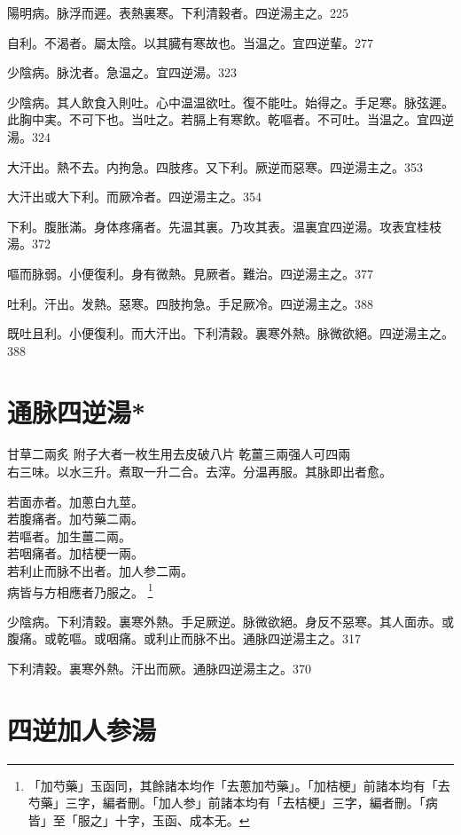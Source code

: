 {\khaaitp 陽明病。}脉浮而遲。表熱裏寒。下利清穀者。四逆湯主之。225

自利。不渴者。屬太陰。以其臓有寒故也。当温之。宜四逆輩。277

少陰病。脉沈者。急温之。宜四逆湯。323

少陰病。其人飲食入則吐。心中温温欲吐。復不能吐。始得之。手足寒。脉弦遲。此胸中実。不可下也。当吐之。若膈上有寒飲。乾嘔者。不可吐。当温之。宜四逆湯。324

大汗出。熱不去。内拘急。四肢疼。{\khaaitp 又}下利。厥逆而惡寒。四逆湯主之。353

大汗{\khaaitp 出}或大下利。而厥冷者。四逆湯主之。354

下利。腹{\khaaitp 胀}滿。身体疼痛者。先温其裏。乃攻其表。温裏宜四逆湯。攻表宜桂枝湯。372

嘔而脉弱。小便復利。身有微熱。見厥者。難治。四逆湯主之。377

吐利。汗出。发熱。惡寒。四肢拘急。手足厥冷。四逆湯主之。388

既吐且利。小便復利。而大汗出。下利清穀。裏寒外熱。脉微欲絕。四逆湯主之。388

\section{通脉四逆湯*}

甘草{\scriptsize 二兩炙} 附子{\scriptsize 大者一枚生用去皮破八片} 乾薑{\scriptsize 三兩强人可四兩}\\
右三味。以水三升。煮取一升二合。去滓。分温再服。其脉即出者愈。

{\khaaitp 若}面赤者。加蔥{\khaaitp 白}九莖。\\
{\khaaitp 若}腹痛者。加芍藥二兩。\\
{\khaaitp 若}嘔者。加生薑二兩。\\
{\khaaitp 若}咽痛者。加桔梗一兩。\\
{\khaaitp 若}利止而脉不出者。加人参二兩。\\
{\khaaitp 病皆与方相應者乃服之。}
	\footnote{
		「加芍藥」玉函同，其餘諸本均作「去蔥加芍藥」。「加桔梗」前諸本均有「去芍藥」三字，編者刪。「加人参」前諸本均有「去桔梗」三字，編者刪。「病皆」至「服之」十字，玉函、成本无。
	}

少陰病。下利清穀。裏寒外熱。手足厥逆。脉微欲絕。身反不惡寒。其人面赤。或腹痛。或乾嘔。或咽痛。或利止而脉不出。通脉四逆湯主之。317

下利清穀。裏寒外熱。汗出而厥。通脉四逆湯主之。370

\section{四逆加人参湯}

